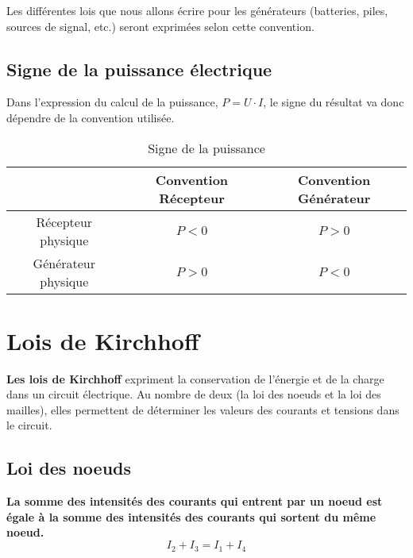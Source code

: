 Les différentes lois que nous allons écrire pour les générateurs (batteries, piles, sources de signal, etc.) seront exprimées selon cette convention.

\subsection*{Signe de la puissance électrique}

Dans l'expression du calcul de la puissance, $P=U \cdot I$, le signe du résultat va donc dépendre de la convention utilisée.

\begin{table}[!h]
\begin{center}
\bgroup
\def\arraystretch{1.5}%
\begin{tabular}{|c|c|c|}
	\hline
	& \textbf{Convention Récepteur} & \textbf{Convention Générateur} \\
	\hline
	Récepteur physique  & $P<0$ & $P>0$ \\
	\hline
	Générateur physique & $P>0$ & $P<0$ \\
	\hline
\end{tabular}
\egroup
\end{center}
	\caption{ Signe de la puissance }
\end{table}

\section{Lois de Kirchhoff}
\textbf{Les lois de Kirchhoff} expriment la conservation de l'énergie et de la charge dans un circuit électrique. Au nombre de deux (la loi des noeuds et la loi des mailles), elles permettent de déterminer les valeurs des courants et tensions dans le circuit.

\subsection*{Loi des noeuds}
\vspace{0.5cm}
\begin{minipage}{3cm}
\begin{center}

\end{center}
\end{minipage}
\hspace{1cm}
\begin{minipage}{10cm} 
\textbf{La somme des intensités des courants qui entrent par un noeud est égale à la somme des intensités des courants qui sortent du même noeud.} \\
	$$ I_2 + I_3 = I_1 + I_4 $$
\end{minipage}\\

